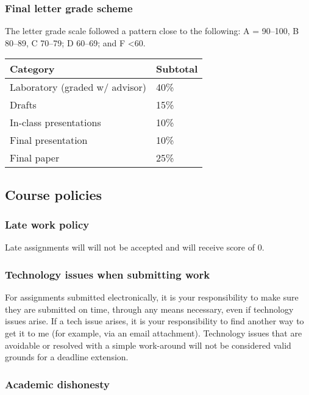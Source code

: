 \hypertarget{final-letter-grade-scheme}{%
\subsubsection{Final letter grade
scheme}\label{final-letter-grade-scheme}}

The letter grade scale followed a pattern close to the following: A =
90--100, B 80--89, C 70--79; D 60--69; and F \textless60.

\begin{longtable}[]{@{}ll@{}}
\toprule
Category & Subtotal\tabularnewline
\midrule
\endhead
Laboratory (graded w/ advisor) & 40\%\tabularnewline
Drafts & 15\%\tabularnewline
In-class presentations & 10\%\tabularnewline
Final presentation & 10\%\tabularnewline
Final paper & 25\%\tabularnewline
\bottomrule
\end{longtable}

\hypertarget{course-policies}{%
\subsection{Course policies}\label{course-policies}}

\hypertarget{late-work-policy}{%
\subsubsection{Late work policy}\label{late-work-policy}}

Late assignments will will not be accepted and will receive score of 0.

\hypertarget{technology-issues-when-submitting-work}{%
\subsubsection{Technology issues when submitting
work}\label{technology-issues-when-submitting-work}}

For assignments submitted electronically, it is your responsibility to
make sure they are submitted on time, through any means necessary, even
if technology issues arise. If a tech issue arises, it is your
responsibility to find another way to get it to me (for example, via an
email attachment). Technology issues that are avoidable or resolved with
a simple work-around will not be considered valid grounds for a deadline
extension.

\hypertarget{academic-dishonesty}{%
\subsubsection{Academic dishonesty}\label{academic-dishonesty}}

